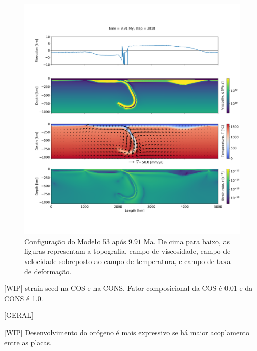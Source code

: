 \begin{figure}
    \centering
    \includegraphics[trim={1.5cm 3.5cm 0.0cm 4cm}, clip, width=1.0 \textwidth]{fig/strak_53-11.png}
    \caption{Configuração do Modelo 53 após $9.91$ Ma. De cima para baixo, as figuras representam a topografia, campo de viscosidade, campo de velocidade sobreposto ao campo de temperatura, e campo de taxa de deformação.}
    \label{fig:stra_53-11}
\end{figure}

[WIP] strain seed na COS e na CONS. Fator composicional da COS é 0.01 e da CONS é 1.0.


[GERAL]

[WIP] Desenvolvimento do orógeno é mais expressivo se há maior acoplamento entre as placas.









